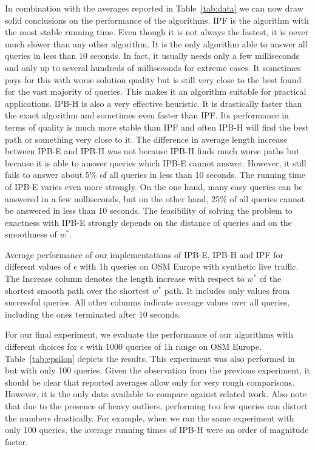 \documentclass[a4paper,UKenglish,cleveref, autoref, thm-restate]{lipics-v2021}
\begin{document}
In combination with the averages reported in Table~\ref{tab:data} we can now draw solid conclusions on the performance of the algorithms.
IPF is the algorithm with the most stable running time.
Even though it is not always the fastest, it is never much slower than any other algorithm.
It is the only algorithm able to answer all queries in less than 10 seconds.
In fact, it usually needs only a few milliseconds and only up to several hundreds of milliseconds for extreme cases.
It sometimes pays for this with worse solution quality but is still very close to the best found for the vast majority of queries.
This makes it an algorithm suitable for practical applications.
IPB-H is also a very effective heuristic.
It is drastically faster than the exact algorithm and sometimes even faster than IPF.
Its performance in terms of quality is much more stable than IPF and often IPB-H will find the best path or something very close to it.
The difference in average length increase between IPB-E and IPB-H was not because IPB-H finds much worse paths but because it is able to answer queries which IPB-E cannot answer.
However, it still fails to answer about 5\% of all queries in less than 10 seconds.
The running time of IPB-E varies even more strongly.
On the one hand, many easy queries can be answered in a few milliseconds, but on the other hand, 25\% of all queries cannot be answered in less than 10 seconds.
The feasibility of solving the problem to exactness with IPB-E strongly depends on the distance of queries and on the smoothness of $w^*$.

\begin{table}[t]
\centering
\caption{
Average performance of our implementations of IPB-E, IPB-H and IPF for different values of $\epsilon$ with 1h queries on OSM Europe with synthetic live traffic.
The Increase column denotes the length increase with respect to $w^*$ of the shortest smooth path over the shortest $w^*$ path.
It includes only values from successful queries.
All other columns indicate average values over all queries, including the ones terminated after 10 seconds.
}\label{tab:epsilon}

\end{table}

For our final experiment, we evaluate the performance of our algorithms with different choices for $\epsilon$ with 1000 queries of 1h range on OSM Europe.
Table~\ref{tab:epsilon} depicts the results.
This experiment was also performed in~\cite{dss-tarrn-18} but with only 100 queries.
Given the observation from the previous experiment, it should be clear that reported averages allow only for very rough comparisons.
However, it is the only data available to compare against related work.
Also note that due to the presence of heavy outliers, performing too few queries can distort the numbers drastically.
For example, when we ran the same experiment with only 100 queries, the average running times of IPB-H were an order of magnitude faster.
\end{document}

